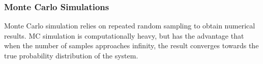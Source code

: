 \subsubsection{Monte Carlo Simulations}

Monte Carlo simulation relies on repeated random sampling to obtain numerical results. MC simulation is computationally heavy, but has the advantage that when the number of samples approaches infinity, the result converges towards the true probability distribution of the system. \\


